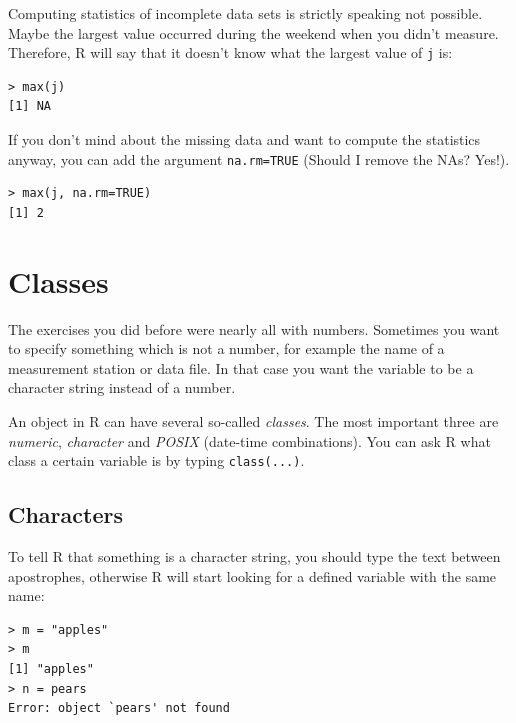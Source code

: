 \documentclass[a4paper,11pt,twocolumn,tablecaptionabove]{scrartcl}
\begin{document}
Computing statistics of incomplete data sets is strictly speaking not possible. Maybe the largest value occurred during the weekend when you didn't measure. Therefore, R will say that it doesn't know what the largest value of \texttt{j} is: 

\begin{Verbatim}[frame=single,gobble=0]
> max(j)
[1] NA
\end{Verbatim}

If you don't mind about the missing data and want to compute the statistics anyway, you can add the argument \texttt{na.rm=TRUE} (Should I remove the NAs? Yes!). 

\begin{Verbatim}[frame=single,gobble=0]
> max(j, na.rm=TRUE)
[1] 2
\end{Verbatim}


\section{Classes}

The exercises you did before were nearly all with numbers. Sometimes you want to specify something which is not a number, for example the name of a measurement station or data file. In that case you want the variable to be a character string instead of a number. 

An object in R can have several so-called \emph{classes}. The most important three are
\emph{numeric}, \emph{character} and \emph{POSIX} (date-time combinations). You can ask R what class a certain variable is by typing \texttt{class(...)}. 

\subsection{Characters}
\label{sec:characters}

To tell R that something is a character string, you should type the text between apostrophes, otherwise R will start looking for a defined variable with the same name:

\begin{Verbatim}[frame=single,gobble=0]
> m = "apples"
> m
[1] "apples"
> n = pears
Error: object `pears' not found
\end{Verbatim}
\end{document}
